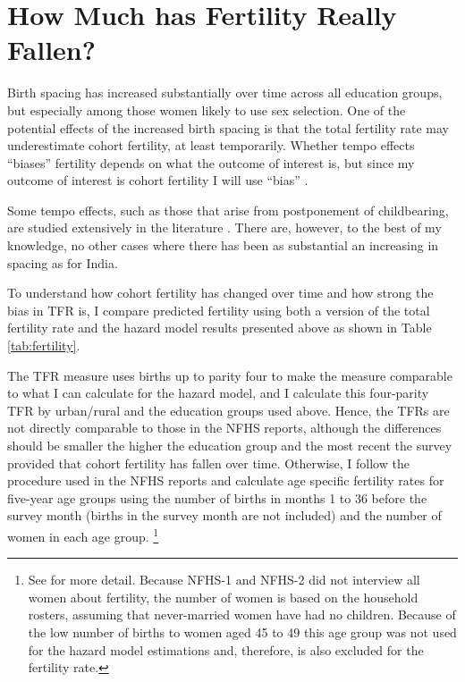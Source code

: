 \documentclass[12pt,letterpaper]{article}
\begin{document}
\section{How Much has Fertility Really Fallen?\label{sec:fertility}}

Birth spacing has increased substantially over time across all education groups, but 
especially among those women likely to use sex selection.
One of the potential effects of the increased birth spacing is that the total fertility
rate may underestimate cohort fertility, at least temporarily.
Whether tempo effects ``biases'' fertility depends on what the outcome of interest is,
but since my outcome of interest is cohort fertility I will use ``bias''
\citep{Ni-Bhrolchain2011}.

Some tempo effects, such as those that arise from postponement of childbearing, are 
studied extensively in the literature \citep{Bongaarts1999}.
There are, however, to the best of my knowledge, no other cases where there has been
as substantial an increasing in spacing as for India.
 
To understand how cohort fertility has changed over time and how strong the bias in
TFR is, I compare predicted fertility using both a version of the total fertility
rate and the hazard model results presented above as shown in Table \ref{tab:fertility}.



The TFR measure uses births up to parity four to make the measure comparable to what I 
can calculate for the hazard model, and I calculate this four-parity TFR by urban/rural 
and the education groups used above.
Hence, the TFRs are not directly comparable to those in the NFHS reports, although the
differences should be smaller the higher the education group and the most recent the 
survey provided that cohort fertility has fallen over time.
Otherwise, I follow the procedure used in the NFHS reports and calculate age specific 
fertility rates for five-year age groups using the number of births in months 1 to 36 
before the survey month (births in the survey month are not included) and the number
of women in each age group.%
\footnote{
See \citet{Croft2018} for more detail.
Because NFHS-1 and NFHS-2 did not interview all women about fertility, the number of women 
is based on the household rosters, assuming that never-married women have had no children.
Because of the low number of births to women aged 45 to 49 this age group was not
used for the hazard model estimations and, therefore, is also excluded for the fertility
rate.
}
\end{document}
